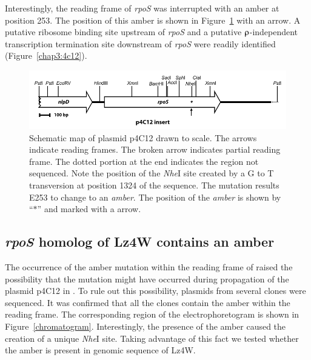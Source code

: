 Interestingly, the reading frame of \emph{rpoS} was interrupted
with an amber at position 253. The position of this amber is shown
in Figure~\ref{chap3:4c12_map} with an arrow. A putative ribosome
binding site upstream of \emph{rpoS} and a putative
$\rhoup$-independent transcription termination site downstream of
\emph{rpoS} were readily identified (Figure~\ref{chap3:4c12}).

\begin{figure}[tbp]
\includegraphics{figures/chap3_4c12_map}
\caption[Schematic map of plasmid p4C12]{Schematic map of plasmid
p4C12 drawn to  scale. The arrows indicate reading frames. The
broken arrow indicates partial reading frame. The dotted portion
at the end indicates the region not sequenced. Note the position
of the \emph{Nhe}I site created by a G to T transversion at
position 1324 of the sequence. The mutation results E253 to change
to an \emph{amber}. The position of the \emph{amber} is shown by
``$\ast$'' and marked with a arrow.} \label{chap3:4c12_map}
\end{figure}



\subsection{\emph{rpoS} homolog of Lz4W contains an amber}




The occurrence of the amber mutation within the reading frame of
\lzsig{} raised the possibility that the mutation might have
occurred during propagation of the plasmid p4C12 in . To
rule out this possibility, plasmids from several clones were
sequenced. It was confirmed that all the clones contain the amber
within the  reading frame. The corresponding region of the
electrophoretogram is shown in Figure~\ref{chromatogram}.
Interestingly, the presence of the amber caused the creation of a
unique \emph{Nhe}I site. Taking advantage of this fact we tested
whether the amber is present in genomic sequence of Lz4W.

